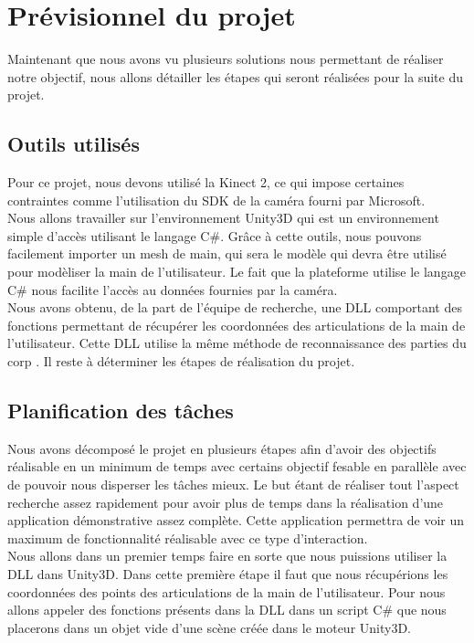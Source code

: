 \chapter{Prévisionnel du projet}
Maintenant que nous avons vu plusieurs solutions nous permettant de réaliser notre 
objectif, nous allons détailler les étapes qui seront réalisées pour la suite du projet.

\section{Outils utilisés}
Pour ce projet, nous devons utilisé la Kinect 2, ce qui impose certaines contraintes comme l'utilisation
du SDK de la caméra fourni par Microsoft.\\

Nous allons travailler sur l'environnement Unity3D qui est 
un environnement simple d'accès utilisant le langage C\#. Grâce à cette outils, nous pouvons
facilement importer un mesh de main, qui sera le modèle qui devra être utilisé pour modèliser
la main de l'utilisateur. Le fait que la plateforme utilise le langage C\# nous facilite 
l'accès au données fournies par la caméra.\\

Nous avons obtenu, de la part de l'équipe de recherche, une DLL comportant des fonctions permettant
de récupérer les coordonnées des articulations de la main de l'utilisateur. Cette DLL utilise 
la même méthode de reconnaissance des parties du corp \cite{export:145347}. Il reste à déterminer les 
étapes de réalisation du projet.

\section{Planification des tâches}
Nous avons décomposé le projet en plusieurs étapes afin d'avoir des objectifs réalisable en 
un minimum de temps avec certains objectif fesable en parallèle avec de pouvoir nous disperser
les tâches mieux. Le but étant de réaliser tout l'aspect recherche assez rapidement pour 
avoir plus de temps dans la réalisation d'une application démonstrative assez complète. Cette application
permettra de voir un maximum de fonctionnalité réalisable avec ce type d'interaction.\\

Nous allons dans un premier temps faire en sorte que nous puissions utiliser la DLL dans Unity3D.
Dans cette première étape il faut que nous récupérions les coordonnées des points des articulations
de la main de l'utilisateur. Pour nous allons appeler des fonctions présents dans la DLL dans un 
script C\# que nous placerons dans un objet vide d'une scène créée dans le moteur Unity3D.\\

